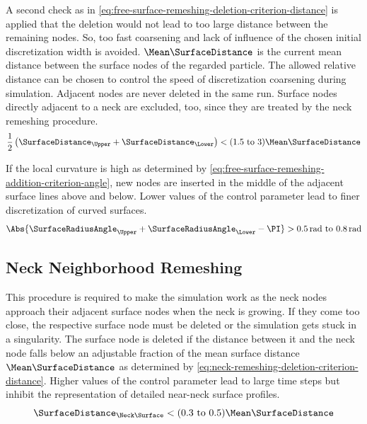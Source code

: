 A second check as in \cref{eq:free-surface-remeshing-deletion-criterion-distance} is applied that the deletion would not lead to too large distance between the remaining nodes.
So, too fast coarsening and lack of influence of the chosen initial discretization width is avoided.
$\Mean\SurfaceDistance$ is the current mean distance between the surface nodes of the regarded particle.
The allowed relative distance can be chosen to control the speed of discretization coarsening during simulation.
Adjacent nodes are never deleted in the same run.
Surface nodes directly adjacent to a neck are excluded, too, since they are treated by the neck remeshing procedure.
\begin{equation}
    \frac12 \left( \SurfaceDistance_{\Upper} + \SurfaceDistance_{\Lower} \right) < (\numrange{1.5}{3}) \Mean\SurfaceDistance
    \label{eq:free-surface-remeshing-deletion-criterion-distance}
\end{equation}

If the local curvature is high as determined by \cref{eq:free-surface-remeshing-addition-criterion-angle}, new nodes are inserted in the middle of the adjacent surface lines above and below.
Lower values of the control parameter lead to finer discretization of curved surfaces.
\begin{equation}
    \Abs{\SurfaceRadiusAngle_{\Upper} + \SurfaceRadiusAngle_{\Lower} - \PI} > \qtyrange{0.5}{0.8}{\radian}
    \label{eq:free-surface-remeshing-addition-criterion-angle}
\end{equation}

\subsection{Neck Neighborhood Remeshing}\label{sec:neck-neighborhood-remeshing}

This procedure is required to make the simulation work as the neck nodes approach their adjacent surface nodes when the neck is growing.
If they come too close, the respective surface node must be deleted or the simulation gets stuck in a singularity.
The surface node is deleted if the distance between it and the neck node falls below an adjustable fraction of the mean surface distance $\Mean\SurfaceDistance$ as determined by \cref{eq:neck-remeshing-deletion-criterion-distance}.
Higher values of the control parameter lead to large time steps but inhibit the representation of detailed near-neck surface profiles.
\begin{equation}
    \SurfaceDistance_{\Neck\Surface} < (\numrange{0.3}{0.5}) \Mean\SurfaceDistance
    \label{eq:neck-remeshing-deletion-criterion-distance}
\end{equation}

